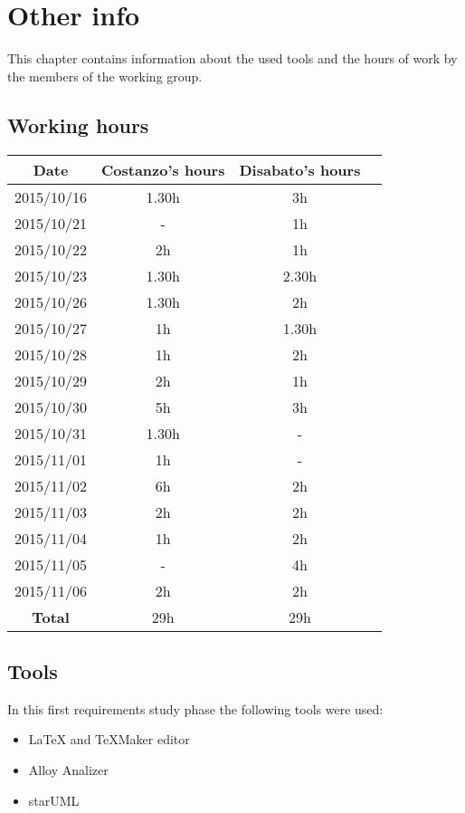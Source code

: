 \chapter{Other info}
\label{otherInfo}
This chapter contains information about the used tools and the hours of work by the members of the working group.

\clearpage

\section{Working hours}
\begin{table}[h!]
\begin{tabular}{cccc}
\hline
Date & Costanzo's hours & Disabato's hours  &    \\ \hline
2015/10/16 & 1.30h & 3h &    \\ \hline
2015/10/21 & - & 1h &    \\ \hline
2015/10/22 & 2h & 1h &    \\ \hline
2015/10/23 & 1.30h & 2.30h &    \\ \hline
2015/10/26 & 1.30h & 2h &    \\ \hline
2015/10/27 & 1h & 1.30h &    \\ \hline
2015/10/28 & 1h & 2h &    \\ \hline
2015/10/29 & 2h & 1h & \\ \hline
2015/10/30 & 5h & 3h &    \\ \hline
2015/10/31 & 1.30h & - &    \\ \hline
2015/11/01 & 1h & - &    \\ \hline
2015/11/02 & 6h & 2h &    \\ \hline
2015/11/03 & 2h & 2h &    \\ \hline
2015/11/04 & 1h & 2h &    \\ \hline
2015/11/05 & - & 4h &    \\ \hline
2015/11/06 & 2h & 2h &    \\ \hline
\textbf{Total} & 29h & 29h &    \\ \hline
\end{tabular}
\end{table}

\section{Tools}
In this first requirements study phase the following tools were used:
\begin{itemize}
	\item \LaTeX{} and TeXMaker editor
	\item Alloy Analizer
	\item starUML
\end{itemize}

\acresetall